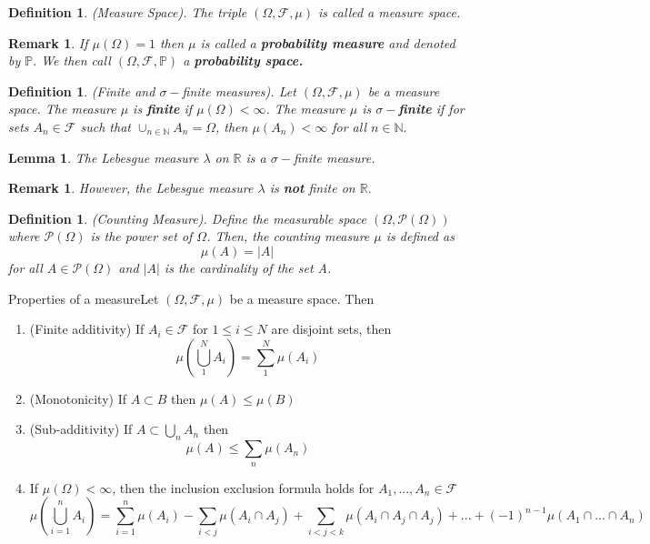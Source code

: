 \documentclass[twoside]{article}
\newtheorem{lemma}[theorem]{Lemma}
\newtheorem{definition}[theorem]{Definition}
\newtheorem{remark}[theorem]{Remark}
\newcommand{\sigmalgebra}{\mathcal{F}}
\newcommand{\powerset}{\mathcal{P}}
\newcommand{\prob}{\mathbb{P}}
\begin{document}
\begin{definition}(Measure Space). The triple $(\Omega, \sigmalgebra, \mu)$ is called a measure space.
\end{definition}

\begin{remark}If $\mu(\Omega) = 1$ then $\mu$ is called a \textbf{probability measure} and denoted by $\prob.$ We then call $(\Omega, \sigmalgebra, \prob)$ a \textbf{probability space.}
\end{remark}


\begin{definition}(Finite and $\sigma-$finite measures). Let $(\Omega, \sigmalgebra, \mu)$ be a measure space. The measure $\mu$ is \textbf{finite} if $\mu(\Omega) < \infty$. The measure $\mu$ is \textbf{$\sigma-$finite} if for sets $A_n \in \sigmalgebra$ such that $\cup_{n \in \mathbb{N}}A_n = \Omega$, then $\mu(A_n) < \infty$ for all $n \in \mathbb{N}.$
\end{definition}

\begin{lemma}The Lebesgue measure $\lambda$ on $\mathbb{R}$ is a $\sigma-$finite measure.
\end{lemma}
\begin{remark}However, the Lebesgue measure $\lambda$ is \textbf{not} finite on $\mathbb{R}.$
\end{remark}

\begin{definition}(Counting Measure). Define the measurable space $(\Omega, \powerset(\Omega))$ where $\powerset(\Omega)$ is the power set of $\Omega$. Then, the counting measure $\mu$ is defined as 
$$
\mu(A) = |A|
$$
for all $A \in \powerset(\Omega)$ and $|A|$ is the cardinality of the set A.
\end{definition}

\begin{proposition_exam}{Properties of a measure}{}Let $(\Omega, \sigmalgebra, \mu)$ be a measure space. Then 
\begin{enumerate}
\item (Finite additivity) If $A_i \in \sigmalgebra$ for $1 \leq i \leq N$ are disjoint sets, then $$
\mu(\bigcup_{1}^{N}A_i) = \sum_{1}^{N}\mu(A_i)
$$
\item (Monotonicity) If $A \subset B$ then $\mu(A) \leq \mu(B)$ 
\item (Sub-additivity) If $A \subset \bigcup_nA_n$ then $$\mu(A) \leq \sum_n \mu(A_n)$$
\item If $\mu(\Omega) < \infty$, then the inclusion exclusion formula holds for $A_1,...,A_n \in \sigmalgebra$ 
$$
\mu(\bigcup_{i=1}^nA_i) = \sum_{i=1}^n\mu(A_i) - \sum_{i < j}\mu (A_i \cap A_j) + \sum_{i < j < k}\mu(A_i \cap A_j \cap A_j) + ... + (-1)^{n-1}\mu(A_1 \cap ... \cap A_n)
$$
\end{enumerate}
\end{proposition_exam}
\end{document}
